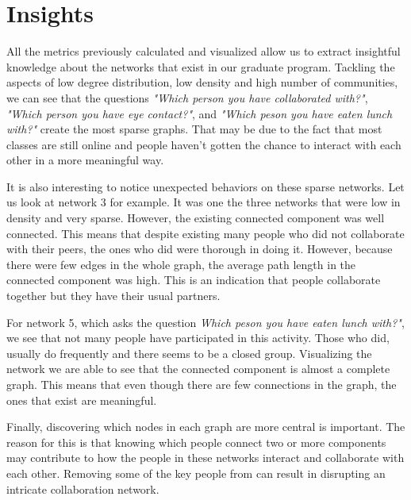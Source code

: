 \section{Insights}
All the metrics previously calculated and visualized allow us to extract insightful knowledge about the networks that exist in our graduate program. Tackling the aspects of low degree distribution, low density and high number of communities, we can see that the questions \textit{"Which person you have collaborated with?"}, \textit{"Which person you have eye contact?"}, and \textit{"Which peson you have eaten lunch with?"} create the most sparse graphs. That may be due to the fact that most classes are still online and people haven't gotten the chance to interact with each other in a more meaningful way.

It is also interesting to notice unexpected behaviors on these sparse networks. Let us look at network 3 for example. It was one the three networks that were low in density and very sparse. However, the existing connected component was well connected. This means that despite existing many people who did not collaborate with their peers, the ones who did were thorough in doing it. However, because there were few edges in the whole graph, the average path length in the connected component was high. This is an indication that people collaborate together but they have their usual partners.

For network 5, which asks the question \textit{Which peson you have eaten lunch with?"}, we see that not many people have participated in this activity. Those who did, usually do frequently and there seems to be a closed group. Visualizing the network we are able to see that the connected component is almost a complete graph. This means that even though there are few connections in the graph, the ones that exist are meaningful.

Finally, discovering which nodes in each graph are more central is important. The reason for this is that knowing which people connect two or more components may contribute to how the people in these networks interact and collaborate with each other. Removing some of the key people from can result in disrupting an intricate collaboration network. 